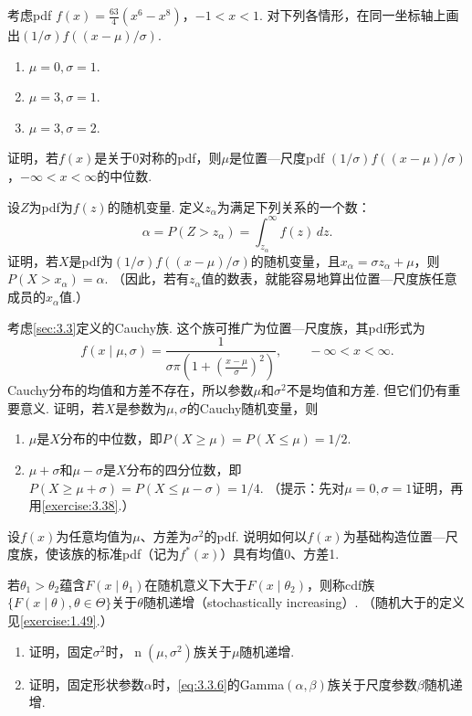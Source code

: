 \begin{exercise}\label{exercise:3.36}
考虑pdf $f(x)=\frac{63}4(x^6-x^8)$，$-1<x<1$. 对下列各情形，在同一坐标轴上画出$(1/\sigma)f((x-\mu)/\sigma)$.
\begin{enumerate}
\item[(a)] $\mu=0,\sigma=1$.
\item[(b)] $\mu=3,\sigma=1$.
\item[(c)] $\mu=3,\sigma=2$.
\end{enumerate}
\end{exercise}
\begin{exercise}\label{exercise:3.37}
证明，若$f(x)$是关于0对称的pdf，则$\mu$是位置—尺度pdf $(1/\sigma)f((x-\mu)/\sigma)$，$-\infty<x<\infty$的中位数.
\end{exercise}
\begin{exercise}\label{exercise:3.38}
设$Z$为pdf为$f(z)$的随机变量. 定义$z_\alpha$为满足下列关系的一个数：
$$\alpha=P(Z>z_\alpha)=\int_{z_\alpha}^\infty f(z)\,dz.$$
证明，若$X$是pdf为$(1/\sigma)f((x-\mu)/\sigma)$的随机变量，且$x_\alpha=\sigma z_\alpha+\mu$，则$P(X>x_\alpha)=\alpha$. （因此，若有$z_\alpha$值的数表，就能容易地算出位置—尺度族任意成员的$x_\alpha$值.）
\end{exercise}
\begin{exercise}\label{exercise:3.39}
考虑\autoref{sec:3.3}定义的Cauchy族. 这个族可推广为位置—尺度族，其pdf形式为
$$f(x\mid\mu,\sigma)=\frac1{\sigma\pi\left(1+\left(\frac{x-\mu}\sigma\right)^2\right)},\qquad-\infty<x<\infty.$$
Cauchy分布的均值和方差不存在，所以参数$\mu$和$\sigma^2$不是均值和方差. 但它们仍有重要意义. 证明，若$X$是参数为$\mu,\sigma$的Cauchy随机变量，则
\begin{enumerate}
\item[(a)] $\mu$是$X$分布的中位数，即$P(X\ge\mu)=P(X\le\mu)=1/2$.
\item[(b)] $\mu+\sigma$和$\mu-\sigma$是$X$分布的四分位数，即$P(X\ge\mu+\sigma)=P(X\le\mu-\sigma)=1/4$. （提示：先对$\mu=0,\sigma=1$证明，再用\autoref{exercise:3.38}.）
\end{enumerate}
\end{exercise}
\begin{exercise}\label{exercise:3.40}
设$f(x)$为任意均值为$\mu$、方差为$\sigma^2$的pdf. 说明如何以$f(x)$为基础构造位置—尺度族，使该族的标准pdf（记为$f^*(x)$）具有均值0、方差1.
\end{exercise}
\begin{exercise}\label{exercise:3.41}
若$\theta_1>\theta_2$蕴含$F(x\mid\theta_1)$在随机意义下大于$F(x\mid\theta_2)$，则称cdf族$\{F(x\mid\theta),\theta\in\Theta\}$关于$\theta$随机递增（stochastically increasing）. （随机大于的定义见\autoref{exercise:1.49}.）
\begin{enumerate}
\item[(a)] 证明，固定$\sigma^2$时，$\operatorname n(\mu,\sigma^2)$族关于$\mu$随机递增.
\item[(b)] 证明，固定形状参数$\alpha$时，\eqref{eq:3.3.6}的Gamma$(\alpha,\beta)$族关于尺度参数$\beta$随机递增.
\end{enumerate}
\end{exercise}
